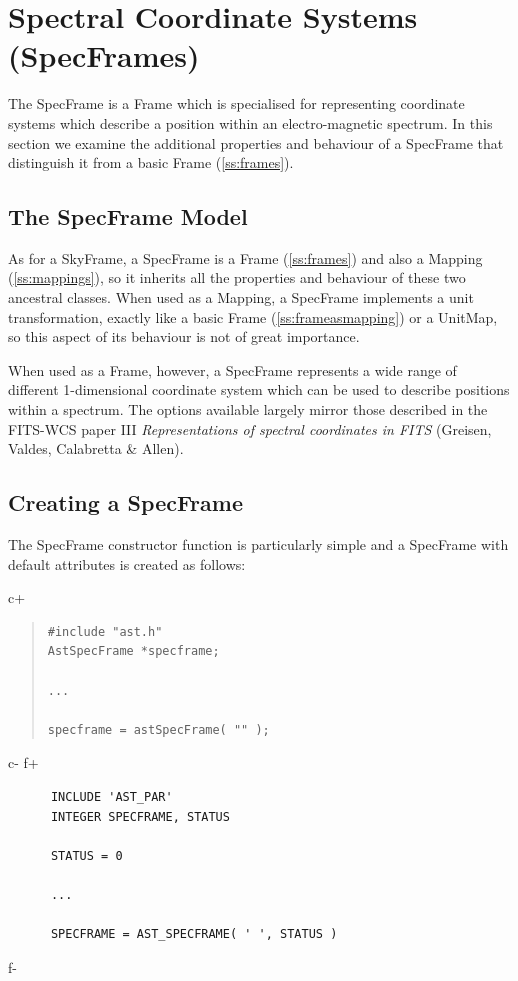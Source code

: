 \documentclass[twoside,11pt]{article}
\newcommand{\xlabel}[1]{}
\newcommand{\secref}[1]{\S\ref{#1}}
\renewcommand{\secref}[1]{\ref{#1}}
\begin{document}
\cleardoublepage
\section{\xlabel{ss_specframes}\label{ss:specframes}Spectral Coordinate Systems (SpecFrames)}

The SpecFrame is a Frame which is specialised for representing coordinate 
systems which describe a position within an electro-magnetic spectrum.
In this section we examine the additional properties and behaviour of a 
SpecFrame that distinguish it from a basic Frame (\secref{ss:frames}).

\subsection{The SpecFrame Model}

As for a SkyFrame, a SpecFrame is a Frame (\secref{ss:frames}) and also a
Mapping (\secref{ss:mappings}), so it inherits all the properties and
behaviour of these two ancestral classes.  When used as a Mapping, a
SpecFrame implements a unit transformation, exactly like a basic Frame
(\secref{ss:frameasmapping}) or a UnitMap, so this aspect of its
behaviour is not of great importance.

When used as a Frame, however, a SpecFrame represents a wide range of
different 1-dimensional coordinate system which can be used to describe
positions within a spectrum. The options available largely mirror those
described in the FITS-WCS paper III \emph{Representations of spectral
coordinates in FITS} (Greisen, Valdes, Calabretta \& Allen).

\subsection{Creating a SpecFrame}

The SpecFrame constructor function is particularly simple and a
SpecFrame with default attributes is created as follows:

c+
\begin{quote}
\small
\begin{verbatim}
#include "ast.h"
AstSpecFrame *specframe;

...

specframe = astSpecFrame( "" );
\end{verbatim}
\normalsize
\end{quote}
c-
f+
\small
\begin{verbatim}
      INCLUDE 'AST_PAR'
      INTEGER SPECFRAME, STATUS

      STATUS = 0

      ...

      SPECFRAME = AST_SPECFRAME( ' ', STATUS )
\end{verbatim}
\normalsize
f-
\end{document}
